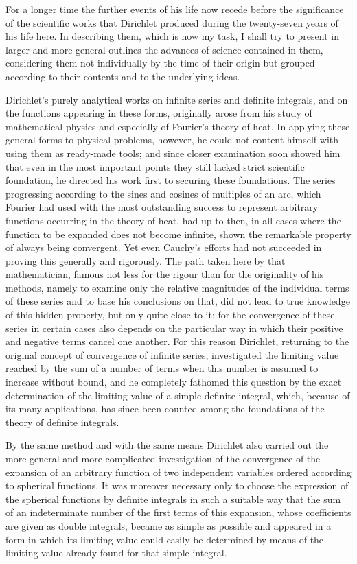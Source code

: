 \documentclass[11pt]{article}
\begin{document}
For a longer time the further events of his life now recede before the significance of the scientific works that Dirichlet produced during the twenty-seven years of his life here. In describing them, which is now my task, I shall try to present in larger and more general outlines the advances of science contained in them, considering them not individually by the time of their origin but grouped according to their contents and to the underlying ideas.

Dirichlet's purely analytical works on infinite series and definite integrals, and on the functions appearing in these forms, originally arose from his study of mathematical physics and especially of Fourier's theory of heat. In applying these general forms to physical problems, however, he could not content himself with using them as ready-made tools; and since closer examination soon showed him that even in the most important points they still lacked strict scientific foundation, he directed his work first to securing these foundations. The series progressing according to the sines and cosines of multiples of an arc, which Fourier had used with the most outstanding success to represent arbitrary functions occurring in the theory of heat, had up to then, in all cases where the function to be expanded does not become infinite, shown the remarkable property of always being convergent. Yet even Cauchy's efforts had not succeeded in proving this generally and rigorously. The path taken here by that mathematician, famous not less for the rigour than for the originality of his methods, namely to examine only the relative magnitudes of the individual terms of these series and to base his conclusions on that, did not lead to true knowledge of this hidden property, but only quite close to it; for the convergence of these series in certain cases also depends on the particular way in which their positive and negative terms cancel one another. For this reason Dirichlet, returning to the original concept of convergence of infinite series, investigated the limiting value reached by the sum of a number of terms when this number is assumed to increase without bound, and he completely fathomed this question by the exact determination of the limiting value of a simple definite integral, which, because of its many applications, has since been counted among the foundations of the theory of definite integrals.

By the same method and with the same means Dirichlet also carried out the more general and more complicated investigation of the convergence of the expansion of an arbitrary function of two independent variables ordered according to spherical functions. It was moreover necessary only to choose the expression of the spherical functions by definite integrals in such a suitable way that the sum of an indeterminate number of the first terms of this expansion, whose coefficients are given as double integrals, became as simple as possible and appeared in a form in which its limiting value could easily be determined by means of the limiting value already found for that simple integral.
\end{document}
